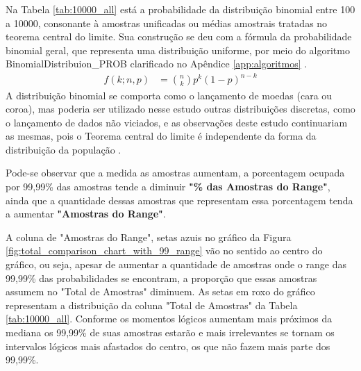 Na Tabela \ref{tab:10000_all} está a probabilidade da distribuição binomial entre 100 a 10000, consonante à amostras unificadas ou médias amostrais tratadas no teorema central do limite. Sua construção se deu com a fórmula da probabilidade binomial geral, que representa uma distribuição uniforme, por meio do algoritmo BinomialDistribuion\_PROB clarificado no Apêndice \ref{app:algoritmos} \cite{mathisfun_binomial_distribution}.
\begin{align*}
f(k;n,p) &= \binom{n}{k} p^k(1 - p)^{n-k}
\end{align*}
A distribuição binomial se comporta como o lançamento de moedas (cara ou coroa), mas poderia ser utilizado nesse estudo outras distribuições discretas, como o lançamento de dados não viciados, e as observações deste estudo continuariam as mesmas, pois o Teorema central do limite é independente da forma da distribuição da população \cite{statisticsbyjim_central_limite_theorem_explainded}.

Pode-se observar que a medida as amostras aumentam, a porcentagem ocupada por 99,99\% das amostras tende a diminuir \textbf{"\% das Amostras do Range"}, ainda que a quantidade dessas amostras que representam essa porcentagem tenda a aumentar \textbf{"Amostras do Range"}.

A coluna de "Amostras do Range", setas azuis no gráfico da Figura \ref{fig:total_comparison_chart_with_99_range} vão no sentido ao centro do gráfico, ou seja, apesar de aumentar a quantidade de amostras onde o range das 99,99\% das probabilidades se encontram, a proporção que essas amostras assumem no "Total de Amostras" diminuem. As setas em roxo do gráfico representam a distribuição da coluna "Total de Amostras" da Tabela \ref{tab:10000_all}. Conforme os momentos lógicos aumentam mais próximos da mediana os 99,99\% de suas amostras estarão e mais irrelevantes se tornam os intervalos lógicos mais afastados do centro, os que não fazem mais parte dos 99,99\%.

